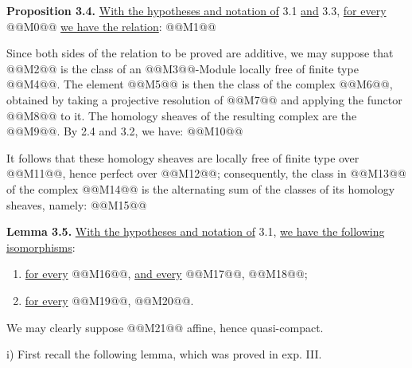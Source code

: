 \textbf{Proposition 3.4.} \uline{With the hypotheses and notation of} 3.1 \uline{and} 3.3, \uline{for every} @@M0@@ \uline{we have the relation}:
@@M1@@

Since both sides of the relation to be proved are additive, we may suppose that @@M2@@ is the class of an @@M3@@-Module locally free of finite type @@M4@@. The element @@M5@@ is then the class of the complex @@M6@@, obtained by taking a projective resolution of @@M7@@ and applying the functor @@M8@@ to it. The homology sheaves of the resulting complex are the @@M9@@. By 2.4 and 3.2, we have:
@@M10@@

It follows that these homology sheaves are locally free of finite type over @@M11@@, hence perfect over @@M12@@; consequently, the class in @@M13@@ of the complex @@M14@@ is the alternating sum of the classes of its homology sheaves, namely:
@@M15@@

\textbf{Lemma 3.5.} \uline{With the hypotheses and notation of} 3.1, \uline{we have the following isomorphisms}:
\begin{enumerate}[label=\roman*)]
\item \uline{for every} @@M16@@, \uline{and every} @@M17@@, @@M18@@;
\item \uline{for every} @@M19@@, @@M20@@.
\end{enumerate}

We may clearly suppose @@M21@@ affine, hence quasi-compact.

i) First recall the following lemma, which was proved in exp. III.
